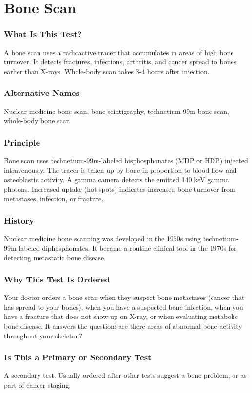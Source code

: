 \section{Bone Scan}


\subsubsection*{What Is This Test?}
A bone scan uses a radioactive tracer that accumulates in areas of high bone turnover. It detects fractures, infections, arthritis, and cancer spread to bones earlier than X-rays. Whole-body scan takes 3-4 hours after injection.

\subsubsection*{Alternative Names}
Nuclear medicine bone scan, bone scintigraphy, technetium-99m bone scan, whole-body bone scan


\subsubsection*{Principle}
Bone scan uses technetium-99m-labeled bisphosphonates (MDP or HDP) injected intravenously. The tracer is taken up by bone in proportion to blood flow and osteoblastic activity. A gamma camera detects the emitted 140 keV gamma photons. Increased uptake (hot spots) indicates increased bone turnover from metastases, infection, or fracture.

\subsubsection*{History}
Nuclear medicine bone scanning was developed in the 1960s using technetium-99m labeled diphosphonates. It became a routine clinical tool in the 1970s for detecting metastatic bone disease.

\subsubsection*{Why This Test Is Ordered}
Your doctor orders a bone scan when they suspect bone metastases (cancer that has spread to your bones), when you have a suspected bone infection, when you have a fracture that does not show up on X-ray, or when evaluating metabolic bone disease. It answers the question: are there areas of abnormal bone activity throughout your skeleton?

\subsubsection*{Is This a Primary or Secondary Test}
A secondary test. Usually ordered after other tests suggest a bone problem, or as part of cancer staging.

